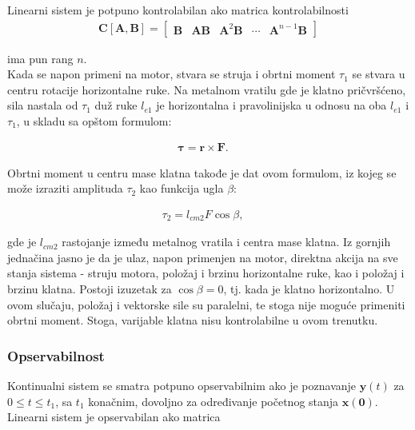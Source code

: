 \documentclass[a4paper,11pt]{article}
\theoremstyle{definition} \newtheorem{deff}{Definicija}[section]
\theoremstyle{definition} \newtheorem{prim}[deff]{Primer}
\theoremstyle{plain} \newtheorem{teor}[deff]{Teorema}
\newcommand{\vect}[1]{\boldsymbol{\mathbf{#1}}}
\begin{document}
	Linearni sistem je potpuno kontrolabilan ako matrica kontrolabilnosti
	\begin{align}
		\vect{C}[\vect{A}, \vect{B}] = \begin{bmatrix}
			\vect{B} & \vect{A}\vect{B} & \vect{A}^2\vect{B} & \cdots & \vect{A}^{n-1}\vect{B}
		\end{bmatrix} 
	\end{align}
	
	ima pun rang $n$. \\
	
	\clearpage
	Kada se napon primeni na motor, stvara se struja i obrtni moment $\tau_1$ se stvara u centru rotacije horizontalne ruke. Na metalnom vratilu gde je klatno pričvršćeno, sila nastala od $\tau_1$ duž ruke $l_{e1}$ je horizontalna i pravolinijska u odnosu na oba $l_{e1}$ i $\tau_1$, u skladu sa opštom formulom:
	
	\begin{align}
		\vect{\tau} = \vect{r} \times \vect{F}. \quad 
	\end{align}
	
	Obrtni moment u centru mase klatna takođe je dat ovom formulom, iz kojeg se može izraziti amplituda $\tau_2$ kao funkcija ugla $\beta$:
	
	\begin{align}
		\tau_2 = l_{cm2} F \cos \beta, \quad
	\end{align}
	
	
	gde je $l_{cm2}$ rastojanje između metalnog vratila i centra mase klatna. Iz gornjih jednačina jasno je da je ulaz, napon primenjen na motor, direktna akcija na sve stanja sistema - struju motora, položaj i brzinu horizontalne ruke, kao i položaj i brzinu klatna. Postoji izuzetak za $\cos \beta = 0$, tj. kada je klatno horizontalno. U ovom slučaju, položaj i vektorske sile su paralelni, te stoga nije moguće primeniti obrtni moment. Stoga, varijable klatna nisu kontrolabilne u ovom trenutku. \\[16pt]
	
	
	\subsubsection{Opservabilnost}
	
	Kontinualni sistem se smatra potpuno opservabilnim ako je poznavanje $\vect{y}(t)$ za $0 \leq t \leq t_1$, sa $t_1$ konačnim, dovoljno za određivanje početnog stanja $\vect{x(0)}$. \\
	
	Linearni sistem je opservabilan ako matrica
	
\end{document}
